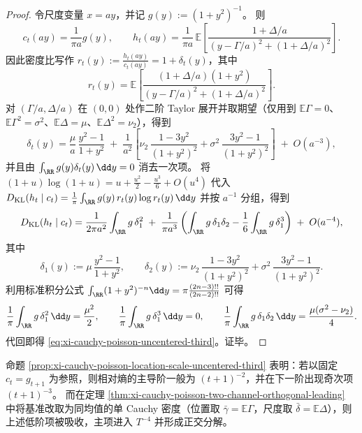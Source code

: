 \begin{proof}
令尺度变量 \(x=ay\)，并记 \(g(y):=(1+y^2)^{-1}\)。
则
\[
c_t(ay)=\frac{1}{\pi a}g(y),\qquad
h_t(ay)=\frac{1}{\pi a}\,\mathbb E\!\left[\frac{1+\Delta/a}{(y-\Gamma/a)^2+(1+\Delta/a)^2}\right].
\]
因此密度比写作 \(r_t(y):=\frac{h_t(ay)}{c_t(ay)}=1+\delta_t(y)\)，其中
\[
r_t(y)=\mathbb E\!\left[\frac{(1+\Delta/a)(1+y^2)}{(y-\Gamma/a)^2+(1+\Delta/a)^2}\right].
\]
对 \((\Gamma/a,\Delta/a)\) 在 \((0,0)\) 处作二阶 Taylor 展开并取期望（仅用到 \(\mathbb E\Gamma=0\)、\(\mathbb E\Gamma^2=\sigma^2\)、\(\mathbb E\Delta=\mu\)、\(\mathbb E\Delta^2=\nu_2\)），得到
\[
\delta_t(y)
=\frac{\mu}{a}\,\frac{y^2-1}{1+y^2}
\;+\;\frac{1}{a^2}\left[
\nu_2\,\frac{1-3y^2}{(1+y^2)^2}
+\sigma^2\,\frac{3y^2-1}{(1+y^2)^2}
\right]
\;+\;O(a^{-3}),
\]
并且由 \(\int_{\RR}g(y)\delta_t(y)\,\dd y=0\) 消去一次项。
将
\(
(1+u)\log(1+u)=u+\frac{u^2}{2}-\frac{u^3}{6}+O(u^4)
\)
代入
\(
D_{\mathrm{KL}}(h_t\mid c_t)=\frac{1}{\pi}\int_{\RR} g(y)\,r_t(y)\log r_t(y)\,\dd y
\)
并按 \(a^{-1}\) 分组，得到
\[
D_{\mathrm{KL}}(h_t\mid c_t)
=\frac{1}{2\pi a^2}\int_{\RR}g\,\delta_1^2
\;+\;\frac{1}{\pi a^3}\left(\int_{\RR}g\,\delta_1\delta_2-\frac16\int_{\RR}g\,\delta_1^3\right)
\;+\;O(a^{-4}),
\]
其中
\[
\delta_1(y):=\mu\,\frac{y^2-1}{1+y^2},
\qquad
\delta_2(y):=\nu_2\,\frac{1-3y^2}{(1+y^2)^2}+\sigma^2\,\frac{3y^2-1}{(1+y^2)^2}.
\]
利用标准积分公式
\(
\int_{\RR}(1+y^2)^{-n}\dd y=\pi\frac{(2n-3)!!}{(2n-2)!!}
\)
可得
\[
\frac{1}{\pi}\int_{\RR}g\,\delta_1^2\,\dd y=\frac{\mu^2}{2},
\qquad
\frac{1}{\pi}\int_{\RR}g\,\delta_1^3\,\dd y=0,
\qquad
\frac{1}{\pi}\int_{\RR}g\,\delta_1\delta_2\,\dd y=\frac{\mu(\sigma^2-\nu_2)}{4}.
\]
代回即得 \eqref{eq:xi-cauchy-poisson-uncentered-third}。证毕。
\end{proof}

\begin{remark}[与均值匹配基准的对照]\label{rem:xi-cauchy-poisson-uncentered-third-vs-matched}
命题 \ref{prop:xi-cauchy-poisson-location-scale-uncentered-third} 表明：若以固定 \(c_t=g_{t+1}\) 为参照，则相对熵的主导阶一般为 \((t+1)^{-2}\)，并在下一阶出现奇次项 \((t+1)^{-3}\)。
而在定理 \ref{thm:xi-cauchy-poisson-two-channel-orthogonal-leading} 中将基准改取为同均值的单 Cauchy 密度（位置取 \(\bar\gamma=\mathbb E\Gamma\)，尺度取 \(\bar\delta=\mathbb E\Delta\)），则上述低阶项被吸收，主项进入 \(T^{-4}\) 并形成正交分解。
\end{remark}

\endinput
